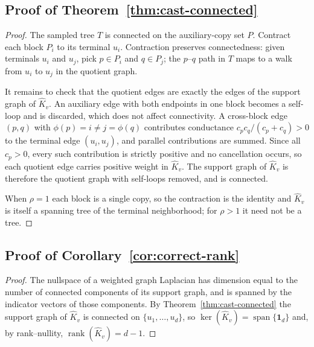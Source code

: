 \documentclass{article}
\newcommand{\1}{\mathbbm{1}}
\theoremstyle{plain}
\begin{document}
\subsection{Proof of Theorem~\ref{thm:cast-connected}}
\label{app:thm_cast_connected}
\begin{proof}
The sampled tree $T$ is connected on the auxiliary-copy set $P$.
Contract each block $P_i$ to its terminal $u_i$. Contraction preserves
connectedness: given terminals $u_i$ and $u_j$, pick $p\in P_i$ and
$q\in P_j$; the $p$--$q$ path in $T$ maps to a walk from $u_i$ to
$u_j$ in the quotient graph.

It remains to check that the quotient edges are exactly the edges of
the support graph of $\widehat K_v$. An auxiliary edge with both
endpoints in one block becomes a self-loop and is discarded, which
does not affect connectivity. A cross-block edge $(p,q)$ with
$\phi(p)=i\neq j=\phi(q)$ contributes conductance
$c_pc_q/(c_p+c_q)>0$ to the terminal edge $(u_i,u_j)$, and parallel
contributions are summed. Since all $c_p>0$, every such contribution
is strictly positive and no cancellation occurs, so each quotient edge
carries positive weight in $\widehat K_v$. The support graph of
$\widehat K_v$ is therefore the quotient graph with self-loops
removed, and is connected.

When $\rho=1$ each block is a single copy, so the contraction is the
identity and $\widehat K_v$ is itself a spanning tree of the terminal
neighborhood; for $\rho>1$ it need not be a tree.
\end{proof}



\subsection{Proof of Corollary~\ref{cor:correct-rank}}
\label{app:correct-rank}
\begin{proof}
The nullspace of a weighted graph Laplacian has dimension equal to the
number of connected components of its support graph, and is spanned by
the indicator vectors of those components. By
Theorem~\ref{thm:cast-connected} the support graph of $\widehat K_v$
is connected on $\{u_1,\ldots,u_d\}$, so
$\ker(\widehat K_v)=\operatorname{span}\{\mathbf 1_d\}$ and, by
rank--nullity, $\operatorname{rank}(\widehat K_v)=d-1$.
\end{proof}
\end{document}
